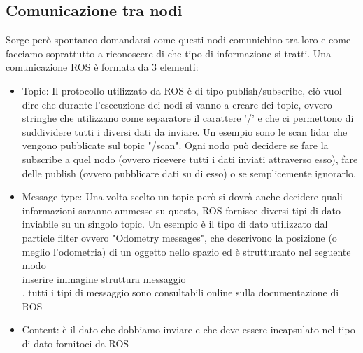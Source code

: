 \subsection{Comunicazione tra nodi}
Sorge però spontaneo domandarsi come questi nodi comunichino tra loro e come facciamo soprattutto a riconoscere di che tipo di informazione si tratti.
Una comunicazione ROS è formata da 3 elementi:
\begin{itemize}
  \item Topic: Il protocollo utilizzato da ROS è di tipo publish/subscribe, ciò vuol dire che durante l'esecuzione dei nodi si vanno a creare dei topic, ovvero stringhe che utilizzano come separatore il carattere '/' e che ci permettono di suddividere tutti i diversi dati da inviare. Un esempio sono le scan lidar che vengono pubblicate sul topic "/scan". Ogni nodo può decidere se fare la subscribe a quel nodo (ovvero ricevere tutti i dati inviati attraverso esso), fare delle publish (ovvero pubblicare dati su di esso) o se semplicemente ignorarlo.
  \item Message type: Una volta scelto un topic però si dovrà anche decidere quali informazioni saranno ammesse su questo, ROS fornisce diversi tipi di dato inviabile su un singolo topic. Un esempio è il tipo di dato utilizzato dal particle filter ovvero "Odometry messages", che descrivono la posizione (o meglio l'odometria) di un oggetto nello spazio ed è strutturanto nel seguente modo \\ inserire immagine struttura messaggio \\. tutti i tipi di messaggio sono consultabili online sulla documentazione di ROS 
  \item Content: è il dato che dobbiamo inviare e che deve essere incapsulato nel tipo di dato fornitoci da ROS
\end{itemize}
